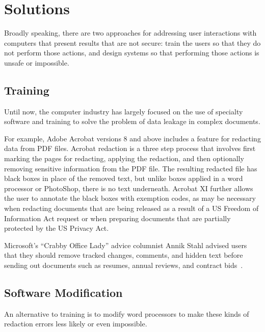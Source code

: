 \documentclass{article}
\begin{document}
\section{Solutions}
Broadly speaking, there are two approaches for addressing user
interactions with computers that present results that are not secure:
train the users so that they do not perform those actions, and design
systems so that performing those actions is unsafe or
impossible. 


\subsection{Training}

Until now, the computer industry has largely focused on
the use of specialty software and training to solve the problem of
data leakage in complex documents. 

For example, Adobe Acrobat versions 8 and above includes a feature for
redacting data from PDF files. Acrobat redaction is a three step process
that involves first marking the pages for redacting, applying the
redaction, and then optionally removing sensitive information from the
PDF file. The resulting redacted file has black boxes in place of the
removed text, but unlike boxes applied in a word processor or
PhotoShop, there is no text underneath.  Acrobat XI further allows
the user to annotate the black boxes with exemption codes, as may be
necessary when redacting documents that are being released as a result
of a US Freedom of Information Act request or when preparing documents
that are partially protected by the US Privacy Act. 


Microsoft's ``Crabby Office Lady'' advice columnist Annik Stahl
advised users that they should remove
tracked changes, comments, and hidden text before sending out
documents such as resumes, annual reviews, and contract bids~\cite{microsoft-track-changes}.


\subsection{Software Modification}

An alternative to training is to modify
word processors to make these kinds of redaction errors less likely or even impossible.
\end{document}
